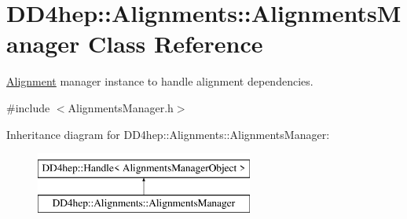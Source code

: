 \hypertarget{class_d_d4hep_1_1_alignments_1_1_alignments_manager}{}\section{D\+D4hep\+:\+:Alignments\+:\+:Alignments\+Manager Class Reference}
\label{class_d_d4hep_1_1_alignments_1_1_alignments_manager}


\hyperlink{class_d_d4hep_1_1_alignments_1_1_alignment}{Alignment} manager instance to handle alignment dependencies.  




{\ttfamily \#include $<$Alignments\+Manager.\+h$>$}

Inheritance diagram for D\+D4hep\+:\+:Alignments\+:\+:Alignments\+Manager\+:\begin{figure}[H]
\begin{center}
\leavevmode
\includegraphics[height=2.000000cm]{class_d_d4hep_1_1_alignments_1_1_alignments_manager}
\end{center}
\end{figure}
